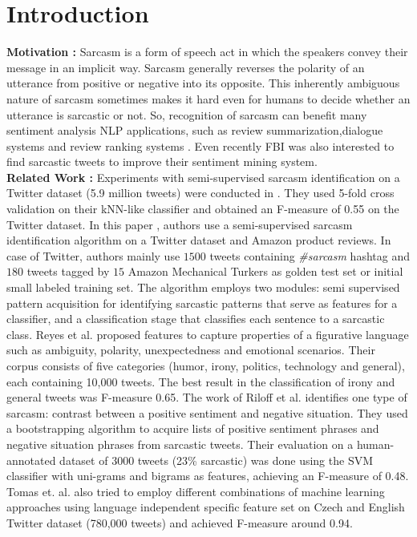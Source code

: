 \section{Introduction}

\noindent \textbf{Motivation :} Sarcasm is a form of speech act in which the speakers convey their message in an
implicit way. Sarcasm generally reverses the polarity of an utterance from positive or negative into its opposite. This inherently ambiguous nature of sarcasm sometimes makes it hard even for humans to decide whether an utterance is sarcastic or not. So, recognition of sarcasm can benefit many sentiment analysis NLP applications, such as review summarization,dialogue systems and review ranking systems \cite{Liu_survey}. Even recently FBI was also interested to find sarcastic tweets \cite{fbi_sarcasm} to improve their sentiment mining system.\\

\noindent \textbf{Related Work :} Experiments with semi-supervised sarcasm identification on a Twitter dataset (5.9 million tweets) were conducted in \cite{davidov10}. They used 5-fold cross validation on their kNN-like classifier and obtained an F-measure of 0.55 on the Twitter dataset. In this paper \cite{davidov10}, authors use a semi-supervised sarcasm identification algorithm on a Twitter dataset and Amazon product reviews. In case of Twitter, authors mainly use $1500$ tweets containing \textit{\#sarcasm} hashtag and $180$ tweets tagged by $15$ Amazon Mechanical Turkers \cite{mturk} as golden test set or initial small labeled training set. The algorithm employs two modules: semi supervised pattern acquisition for identifying sarcastic patterns that serve as features for a classifier, and a classification stage that classifies each sentence to a sarcastic class. Reyes et al. \cite{reyes12} proposed features to capture properties of a figurative language such as ambiguity, polarity, unexpectedness and emotional scenarios. Their corpus consists of five categories (humor, irony, politics, technology and general), each containing 10,000 tweets. The best result in the classification of
irony and general tweets was F-measure 0.65. The work of Riloff et al. \cite{riloff13} identifies one type of sarcasm: contrast between a positive sentiment and negative situation. They used a bootstrapping algorithm to acquire lists of positive sentiment phrases and negative situation phrases from sarcastic tweets. Their evaluation on a human-annotated dataset of 3000 tweets (23\% sarcastic) was done using the SVM classifier with uni-grams and bigrams as features, achieving an F-measure of 0.48. Tomas et. al. \cite{tomas14} also tried to employ different combinations of machine learning approaches using language independent specific feature set on Czech and English Twitter dataset (780,000 tweets) and achieved F-measure around 0.94.\\

